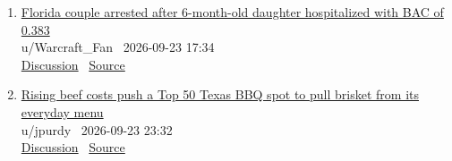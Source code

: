 \documentclass[11pt,a4paper]{article}
\begin{document}
\begin{enumerate}
  \item \href{https://www.reddit.com/r/news/comments/1woclwv/florida_couple_arrested_after_6monthold_daughter/}{Florida couple arrested after 6-month-old daughter hospitalized with BAC of 0.383}\\ {\small u/Warcraft\_Fan \textbullet\ 2026-09-23 17:34}\\ {\small \href{https://www.reddit.com/r/news/comments/1woclwv/florida_couple_arrested_after_6monthold_daughter/}{Discussion} \textbullet\ \href{https://www.kiro7.com/news/trending/florida-couple-arrested-after-6-month-old-daughter-hospitalized-with-bac-0383/JDD73E6T2ZEHLDPLGAU4GGTQD4/}{Source}}
  \item \href{https://www.reddit.com/r/news/comments/1wolrwx/rising_beef_costs_push_a_top_50_texas_bbq_spot_to/}{Rising beef costs push a Top 50 Texas BBQ spot to pull brisket from its everyday menu}\\ {\small u/jpurdy \textbullet\ 2026-09-23 23:32}\\ {\small \href{https://www.reddit.com/r/news/comments/1wolrwx/rising_beef_costs_push_a_top_50_texas_bbq_spot_to/}{Discussion} \textbullet\ \href{https://www.kristv.com/news/local-news/in-your-neighborhood/san-patricio-county/sinton/rising-beef-costs-push-a-top-50-texas-bbq-spot-to-pull-brisket-from-its-everyday-menu}{Source}}
\end{enumerate}
\end{document}
